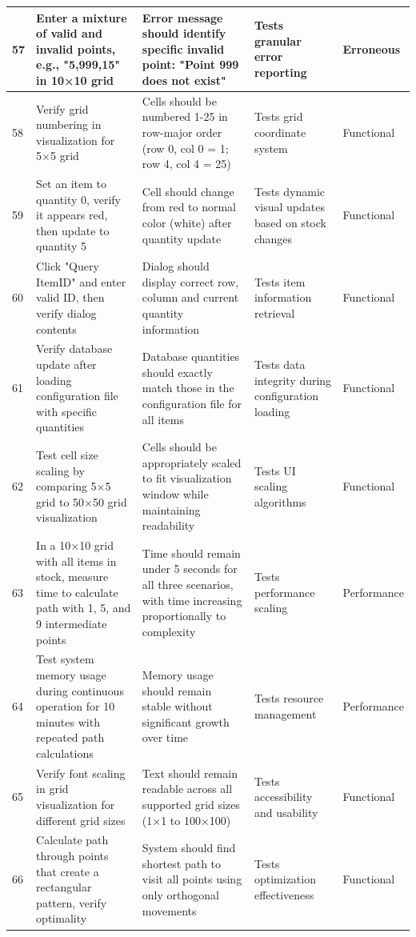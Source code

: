 \begin{longtable}{|p{}|p{}|p{}|p{}|p{}|}
\hline
57 & Enter a mixture of valid and invalid points, e.g., "5,999,15" in 10×10 grid & Error message should identify specific invalid point: "Point 999 does not exist" & Tests granular error reporting & Erroneous \\
\hline
58 & Verify grid numbering in visualization for 5×5 grid & Cells should be numbered 1-25 in row-major order (row 0, col 0 = 1; row 4, col 4 = 25) & Tests grid coordinate system & Functional \\
\hline
59 & Set an item to quantity 0, verify it appears red, then update to quantity 5 & Cell should change from red to normal color (white) after quantity update & Tests dynamic visual updates based on stock changes & Functional \\
\hline
60 & Click "Query ItemID" and enter valid ID, then verify dialog contents & Dialog should display correct row, column and current quantity information & Tests item information retrieval & Functional \\
\hline
61 & Verify database update after loading configuration file with specific quantities & Database quantities should exactly match those in the configuration file for all items & Tests data integrity during configuration loading & Functional \\
\hline
62 & Test cell size scaling by comparing 5×5 grid to 50×50 grid visualization & Cells should be appropriately scaled to fit visualization window while maintaining readability & Tests UI scaling algorithms & Functional \\
\hline
63 & In a 10×10 grid with all items in stock, measure time to calculate path with 1, 5, and 9 intermediate points & Time should remain under 5 seconds for all three scenarios, with time increasing proportionally to complexity & Tests performance scaling & Performance \\
\hline
64 & Test system memory usage during continuous operation for 10 minutes with repeated path calculations & Memory usage should remain stable without significant growth over time & Tests resource management & Performance \\
\hline
65 & Verify font scaling in grid visualization for different grid sizes & Text should remain readable across all supported grid sizes (1×1 to 100×100) & Tests accessibility and usability & Functional \\
\hline
66 & Calculate path through points that create a rectangular pattern, verify optimality & System should find shortest path to visit all points using only orthogonal movements & Tests optimization effectiveness & Functional \\

\end{longtable}
